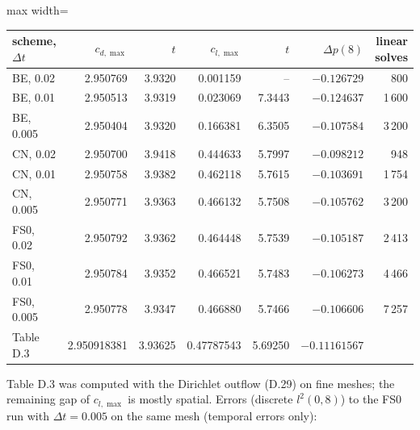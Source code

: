 \documentclass[11pt,a4paper]{article}
\newcommand{\dt}{\Delta t}
\begin{document}
\begin{center}\begin{adjustbox}{max width=\textwidth}
\begin{tabular}{lrrrrrr}
\toprule
scheme, $\dt$ & $c_{d,\max}$ & $t$ & $c_{l,\max}$ & $t$ & $\Delta p(8)$ & linear solves\\
\midrule
BE, 0.02 & 2.950769 & 3.9320 & 0.001159 & -- & $-0.126729$ & 800\\
BE, 0.01 & 2.950513 & 3.9319 & 0.023069 & 7.3443 & $-0.124637$ & 1\,600\\
BE, 0.005 & 2.950404 & 3.9320 & 0.166381 & 6.3505 & $-0.107584$ & 3\,200\\
CN, 0.02 & 2.950700 & 3.9418 & 0.444633 & 5.7997 & $-0.098212$ & 948\\
CN, 0.01 & 2.950758 & 3.9382 & 0.462118 & 5.7615 & $-0.103691$ & 1\,754\\
CN, 0.005 & 2.950771 & 3.9363 & 0.466132 & 5.7508 & $-0.105762$ & 3\,200\\
FS0, 0.02 & 2.950792 & 3.9362 & 0.464448 & 5.7539 & $-0.105187$ & 2\,413\\
FS0, 0.01 & 2.950784 & 3.9352 & 0.466521 & 5.7483 & $-0.106273$ & 4\,466\\
FS0, 0.005 & 2.950778 & 3.9347 & 0.466880 & 5.7466 & $-0.106606$ & 7\,257\\
\midrule
Table D.3 & 2.950918381 & 3.93625 & 0.47787543 & 5.69250 & $-0.11161567$ &\\
\bottomrule
\end{tabular}
\end{adjustbox}\end{center}
Table D.3 was computed with the Dirichlet outflow (D.29) on fine meshes; the remaining gap of $c_{l,\max}$ is mostly
spatial. Errors (discrete $l^2(0,8)$) to the FS0 run with $\dt=0.005$ on the same mesh (temporal errors only):
\end{document}
